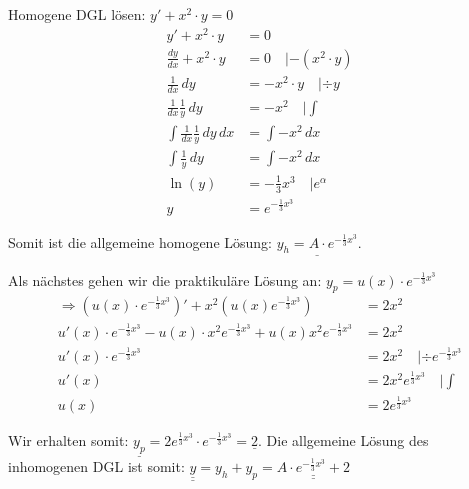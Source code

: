 Homogene DGL lösen: $y' + x^2 \cdot y = 0$
\begin{align*}
y' + x^2 \cdot y &= 0\\
\frac{dy}{dx} + x^2 \cdot y &= 0 \quad | -(x^2 \cdot y)\\
\frac{1}{dx}\, dy &= -x^2 \cdot y \quad | \div y\\
\frac{1}{dx} \frac{1}{y} \, dy &= -x^2 \quad | \int\\
\int \frac{1}{dx} \frac{1}{y} \, dy \, dx &= \int -x^2 \, dx\\
\int \frac{1}{y}\, dy &= \int -x^2 \, dx\\
\ln(y) &= -\frac{1}{3} x^3 \quad | e^\alpha\\
y &= e^{-\frac{1}{3}x^3}
\end{align*}

Somit ist die allgemeine homogene Lösung: $\underline{y_h = A \cdot e^{-\frac{1}{3}x^3}}$.


Als nächstes gehen wir die praktikuläre Lösung an:
$y_p = u(x) \cdot e^{-\frac{1}{3}x^3}$
\begin{align*}
\Rightarrow (u(x) \cdot e^{-\frac{1}{3}x^3})' + x^2 (u(x) e^{-\frac{1}{3}x^3}) &= 2 x^2\\
u'(x) \cdot e^{-\frac{1}{3}x^3} - u(x) \cdot x^2 e^{-\frac{1}{3}x^3} + u(x) x^2 e^{-\frac{1}{3}x^3} &= 2 x^2\\
u'(x) \cdot e^{-\frac{1}{3}x^3} &= 2 x^2 \quad | \div e^{-\frac{1}{3}x^3}\\
u'(x) &= 2 x^2 e^{\frac{1}{3}x^3} \quad | \int\\
u(x) &= 2 e^{\frac{1}{3}x^3}
\end{align*}

Wir erhalten somit: $\underline{y_p} = 2 e^{\frac{1}{3}x^3} \cdot e^{-\frac{1}{3}x^3} = \underline{2}$.
Die allgemeine Lösung des inhomogenen DGL ist somit:
$\underline{\underline{y}} = y_h + y_p = \underline{\underline{A \cdot e^{-\frac{1}{3}x^3} + 2}}$


